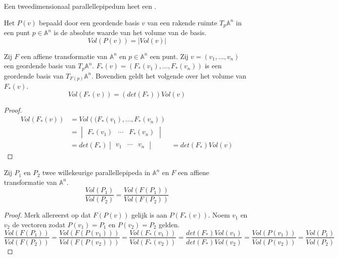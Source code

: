 \documentclass[main.tex]{subfiles}
\begin{document}
\begin{de}
  Een tweedimensionaal parallellepipedum heet een .
\end{de}

\begin{de}
  Het  $P(v)$ bepaald door een geordende basis $v$ van een rakende ruimte $T_{p}\mathbb{A}^{n}$ in een punt $p\in\mathbb{A}^{n}$ is de absolute waarde van het volume van de basis.
  \[ Vol\left(P(v)\right) = |Vol(v)|\]
\end{de}

\begin{st}
  Zij $F$ een affiene transformatie van $\mathbb{A}^{n}$ en $p\in\mathbb{A}^{n}$ een punt.
  Zij $v= (v_{1},\dotsc,v_{n})$ een geordende basis van $T_{p}\mathbb{A}^{n}$.
  $F_{*}(v) = (F_{*}(v_{1}),\dotsc,F_{*}(v_{n}))$ is een geordende basis van $T_{F(p)}\mathbb{A}^{n}$.
  Bovendien geldt het volgende over het volume van $F_{*}(v)$.
  \[ Vol\left( F_{*}(v) \right) = \left(det(F_{*}) \right)Vol(v) \]

  \begin{proof}
    \[
    \begin{array}{rll}
      Vol\left( F_{*}(v) \right) &= Vol\left((F_{*}(v_{1}),\dotsc,F_{*}(v_{n})\right) &\\
                                &= \begin{vmatrix}F_{*}(v_{1}) & \cdots & F_{*}(v_{n})\end{vmatrix} &\\
                                &= det(F_{*}) \begin{vmatrix}v_{1} & \cdots & v_{n}\end{vmatrix} &= det(F_{*})Vol(v)
    \end{array}
    \]
  \end{proof}
\end{st}

\begin{gev}
  Zij $P_{1}$ en $P_{2}$ twee willekeurige parallellepipeda in $\mathbb{A}^{n}$ en $F$ een affiene transformatie van $\mathbb{A}^{n}$.
  \[ \frac{Vol(P_{1})}{Vol(P_{2})} = \frac{Vol(F(P_{1}))}{Vol(F(P_{2}))} \]

  \begin{proof}
    Merk allereerst op dat $F(P(v))$ gelijk is aan $P(F_{*}(v))$. \waarom
    Noem $v_{1}$ en $v_{2}$ de vectoren zodat $P(v_{1}) = P_{1}$ en $P(v_{2}) = P_{2}$ gelden.
    \[
    \frac{Vol(F(P_{1}))}{Vol(F(P_{2}))}
    = \frac{Vol(F(P(v_{1})))}{Vol(F(P(v_{2})))}
    = \frac{Vol(F_{*}(v_{1}))}{Vol(F_{*}(v_{2}))}
    = \frac{det(F_{*})Vol(v_{1})}{det(F_{*})Vol(v_{2})}
    = \frac{Vol(P(v_{1}))}{Vol(P(v_{2}))}
    = \frac{Vol(P_{1})}{Vol(P_{2})}
    \]
  \end{proof}
\end{gev}
\end{document}
